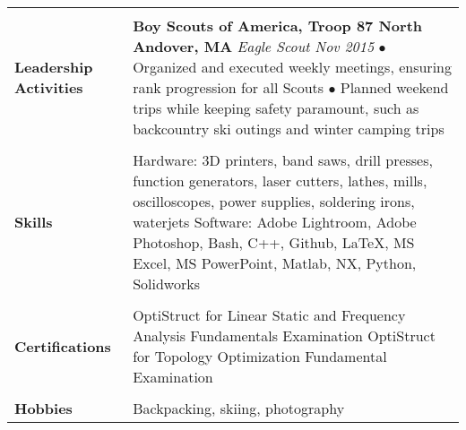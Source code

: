 \documentclass[12pt]{article}
\begin{document}
\begin{table}[H]
\begin{tabularx}{\textwidth}{@{}X p{6.25in} @{}}
		 & \\



		\textbf{Leadership Activities} & \textbf{Boy Scouts of America, Troop 87 \hfill North Andover, MA} \newline \textit{Eagle Scout \hfill Nov 2015} 
		\newline {\small $\bullet$ 
		Organized and executed weekly meetings, ensuring rank progression for all Scouts \newline $\bullet$ 
		Planned weekend trips while keeping safety paramount, such as backcountry ski outings and winter camping trips} 
		\\

		 & \\

		\textbf{Skills} & 
		Hardware: 
		3D printers, band saws, drill presses, function generators, laser cutters, lathes, mills, oscilloscopes, power supplies, soldering irons, waterjets \vspace{0.0625in} \newline 
		Software: 
		Adobe Lightroom, Adobe Photoshop, Bash, C++, Github, \LaTeX, MS Excel, MS PowerPoint, Matlab, NX, Python, Solidworks \\

		 & \\

		\textbf{Certifications} & 
		OptiStruct for Linear Static and Frequency Analysis Fundamentals Examination \newline 
		OptiStruct for Topology Optimization Fundamental Examination \\

		 & \\

		\textbf{Hobbies} & Backpacking, skiing, photography \\
		
	\end{tabularx}
\end{table}
\end{document}
